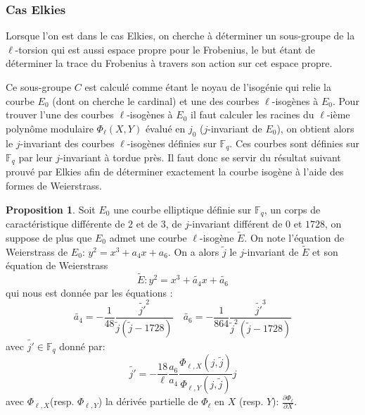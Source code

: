 \documentclass[10pt,a4paper]{book}
\theoremstyle{plain}
\theoremstyle{definition}
\theoremstyle{definition}
\theoremstyle{definition}
\theoremstyle{definition}
\newtheorem{prop}[thm]{Proposition}
\theoremstyle{definition}
\theoremstyle{remark}
\theoremstyle{remark}
\theoremstyle{definition}
\begin{document}
\subsubsection{Cas Elkies} \label{sub:Elkies}
Lorsque l'on est dans le cas Elkies, on cherche à déterminer un sous-groupe de 
la $\ell$-torsion qui est aussi espace propre pour le Frobenius, le but étant 
de déterminer la trace du Frobenius à travers son action sur cet espace propre. 

Ce sous-groupe $C$ est calculé comme étant le noyau de l'isogénie qui relie la 
courbe $E_0$ (dont on cherche le cardinal) et une des courbes $\ell$-isogènes à
$E_0$. Pour trouver l'une des courbes $\ell$-isogènes à $E_0$ il faut calculer 
les racines du $\ell$-ième polynôme modulaire $\Phi_{\ell}(X,Y)$ évalué en 
$j_0$ ($j$-invariant de $E_0$), on obtient alors le $j$-invariant des courbes 
$\ell$-isogènes définies sur $\mathbb{F}_q$. Ces courbes sont définies sur 
$\mathbb{F}_q$ par leur $j$-invariant à tordue près. Il faut donc se servir du 
résultat suivant prouvé par Elkies afin de déterminer exactement la courbe 
isogène à l'aide des formes de Weierstrass.

\begin{prop}
\label{prop:elk:nor}
Soit $E_0$ une courbe elliptique définie sur $\mathbb{F}_q$, un corps de 
caractéristique différente de $2$ et de $3$, de $j$-invariant différent de $0$ 
et $1728$, on suppose de plus que $E_0$ admet une courbe $\ell$-isogène 
$\tilde{E}$. On note l'équation de Weierstrass de $E_0$: $y^2=x^3+a_4x+a_6$. On
a alors $\tilde{j}$ le $j$-invariant de $\tilde{E}$ et son équation de 
Weierstrass
\begin{equation*}
\tilde{E}:y^2=x^3+\tilde{a_4}x+\tilde{a_6}
\end{equation*}
 qui nous est donnée par les équations : 
\begin{equation*}
\tilde{a_4}=-\frac{1}{48}\frac{\tilde{j'}^2}{\tilde{j}(\tilde{j}-1728)} \quad \tilde{a_6}=-\frac{1}{864}\frac{\tilde{j'}^3}{\tilde{j}^2(\tilde{j}-1728)}
\end{equation*}
avec $\tilde{j'} \in \mathbb{F}_q$ donné par:
\begin{equation*}
\tilde{j'}=-\frac{18}{\ell}\frac{a_6}{a_4}\frac{\Phi_{\ell,X}(j,\tilde{j})}{\Phi_{\ell,Y}(j,\tilde{j})}j
\end{equation*}
avec $\Phi_{\ell,X}$(resp. $\Phi_{\ell,Y}$) la dérivée partielle de $\Phi_{\ell}$ en $X$ (resp. $Y$): $\frac{\partial \Phi_{\ell}}{\partial X} $.
\end{prop} 
\end{document}
